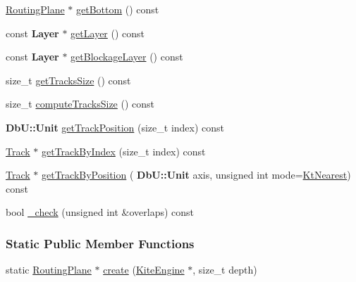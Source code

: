 \begin{DoxyCompactItemize}
\item 
\mbox{\hyperlink{classKite_1_1RoutingPlane}{Routing\+Plane}} $\ast$ \mbox{\hyperlink{classKite_1_1RoutingPlane_a7478ed4841ef25190c021165dd457520}{get\+Bottom}} () const
\item 
const \textbf{ Layer} $\ast$ \mbox{\hyperlink{classKite_1_1RoutingPlane_ab045567c4f529dca7790d66c17c3084f}{get\+Layer}} () const
\item 
const \textbf{ Layer} $\ast$ \mbox{\hyperlink{classKite_1_1RoutingPlane_a4e47dfca4bfafa56d9c0f1dc39dc237e}{get\+Blockage\+Layer}} () const
\item 
size\+\_\+t \mbox{\hyperlink{classKite_1_1RoutingPlane_aa44eb6d4806e49d36bf273cd9d979197}{get\+Tracks\+Size}} () const
\item 
size\+\_\+t \mbox{\hyperlink{classKite_1_1RoutingPlane_a4b4c6bb50297d585962d84b2a165e139}{compute\+Tracks\+Size}} () const
\item 
\textbf{ Db\+U\+::\+Unit} \mbox{\hyperlink{classKite_1_1RoutingPlane_ae2ea9830bfcd3d7f36af63bcad3eed6e}{get\+Track\+Position}} (size\+\_\+t index) const
\item 
\mbox{\hyperlink{classKite_1_1Track}{Track}} $\ast$ \mbox{\hyperlink{classKite_1_1RoutingPlane_a5e9defabb4cb2cb1b0f73b1dc3c677de}{get\+Track\+By\+Index}} (size\+\_\+t index) const
\item 
\mbox{\hyperlink{classKite_1_1Track}{Track}} $\ast$ \mbox{\hyperlink{classKite_1_1RoutingPlane_a8c464eebfa0f85d0b9f4677bb191100c}{get\+Track\+By\+Position}} (\textbf{ Db\+U\+::\+Unit} axis, unsigned int mode=\mbox{\hyperlink{namespaceKite_acca8fffa3182dea5f94208f454f14b47afaf04b2ddbae58557683c20373c0bada}{Kt\+Nearest}}) const
\item 
bool \mbox{\hyperlink{classKite_1_1RoutingPlane_aeea9a19f9b402ffe42c011c9afc2ca73}{\+\_\+check}} (unsigned int \&overlaps) const
\end{DoxyCompactItemize}
\subsubsection*{Static Public Member Functions}
\begin{DoxyCompactItemize}
\item 
static \mbox{\hyperlink{classKite_1_1RoutingPlane}{Routing\+Plane}} $\ast$ \mbox{\hyperlink{classKite_1_1RoutingPlane_a91d1fdb3aac133a9f687207499caf1c4}{create}} (\mbox{\hyperlink{classKite_1_1KiteEngine}{Kite\+Engine}} $\ast$, size\+\_\+t depth)
\end{DoxyCompactItemize}


